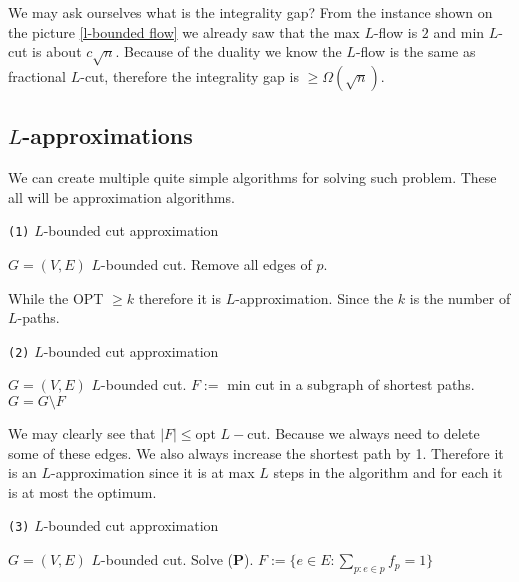 We may ask ourselves what is the integrality gap? From the instance shown on the picture \ref{l-bounded flow} we already saw that the max $L$-flow is $2$ and min $L$-cut is about $c \sqrt{n}$. Because of the duality we know the $L$-flow is the same as fractional $L$-cut, therefore the integrality gap is $\geq \Omega (\sqrt{n})$.

\subsection{$L$-approximations}

We can create multiple quite simple algorithms for solving such problem. These all will be approximation algorithms.

\begin{algorithm}
	\caption{ \texttt{(1)} $L$-bounded cut approximation}
	\begin{algorithmic}[1]
		\Require $G = (V,E)$
		\Ensure $L$-bounded cut.
			\State Remove all edges of $p$.
		\EndWhile
	\end{algorithmic}
\end{algorithm}

\begin{observ}
	While the OPT $\geq k$ therefore it is $L$-approximation. Since the $k$ is the number of $L$-paths.
\end{observ}

\begin{algorithm}
	\caption{ \texttt{(2)} $L$-bounded cut approximation}
	\begin{algorithmic}[1]
		\Require $G = (V,E)$
		\Ensure $L$-bounded cut.
			\State $F := $ min cut in a subgraph of shortest paths.
			\State $G = G \setminus F$
		\EndWhile
	\end{algorithmic}
\end{algorithm}

We may clearly see that $|F| \leq \text{opt } L-\text{cut}$. Because we always need to delete some of these edges. We also always increase the shortest path by 1. Therefore it is an $L$-approximation since it is at max $L$ steps in the algorithm and for each it is at most the optimum.

\begin{algorithm}
	\caption{ \texttt{(3)} $L$-bounded cut approximation}
	\begin{algorithmic}[1]
		\Require $G = (V,E)$
		\Ensure $L$-bounded cut.
		\State Solve (\textbf{P}).
		\State $F := \{e \in E: \sum_{p : e \in p} f_p = 1\}$
	\end{algorithmic}
\end{algorithm}

